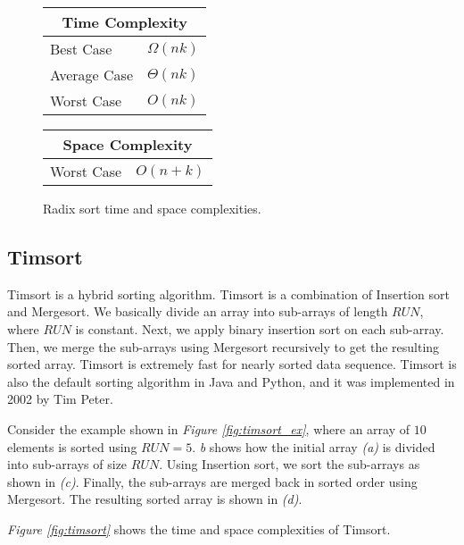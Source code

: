 \begin{figure}[!ht]
    \centering
    \begin{tabular}{l|l}
    \multicolumn{2}{c}{\textbf{Time Complexity}} \\
    \hline
    Best Case    & $\Omega(n k)$ \\
    Average Case & $\Theta(n k)$ \\
    Worst Case   & $O(n k)$ \\
    \end{tabular}
    \quad\quad
    \begin{tabular}{l|l}
    \multicolumn{2}{c}{\textbf{Space Complexity}} \\
    \hline
    Worst Case   & $O(n + k)$
    \end{tabular}
    
    \caption{Radix sort time\cite{kazim2017} and space complexities\cite{big-o}.}
    \label{fig:radixsort}
\end{figure}


\subsection{Timsort}

Timsort is a hybrid sorting algorithm. Timsort is a combination of Insertion sort and Mergesort. We basically divide an array into sub-arrays of length $RUN$, where $RUN$ is constant. Next, we apply binary insertion sort on each sub-array. Then, we merge the sub-arrays using Mergesort recursively to get the resulting sorted array. Timsort is extremely fast for nearly sorted data sequence. Timsort is also the default sorting algorithm in Java and Python, and it was implemented in 2002 by Tim Peter. 

Consider the example shown in \textit{Figure \ref{fig:timsort_ex}}, where an array of $10$ elements is sorted using $RUN=5$. \textit{{b}} shows how the initial array \textit{(a)} is divided into sub-arrays of size $RUN$. Using Insertion sort, we sort the sub-arrays as shown in \textit{(c)}. Finally, the sub-arrays are merged back in sorted order using Mergesort. The resulting sorted array is shown in \textit{(d)}.

\textit{Figure \ref{fig:timsort}} shows the time and space complexities of Timsort.

